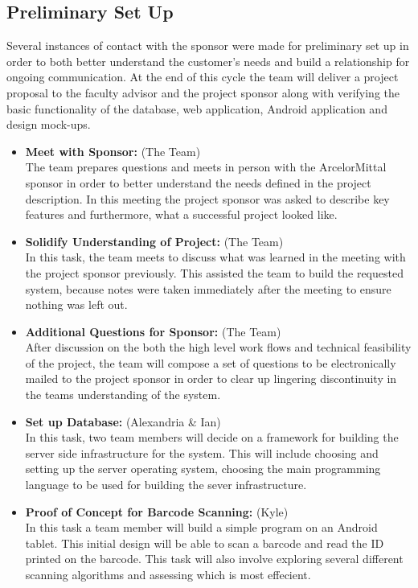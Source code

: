 \documentclass[Letter,11pt]{article}
\begin{document}
	\subsection{Preliminary Set Up}\label{cyc1}
		 Several instances of contact with the sponsor were made for preliminary set up in order to both better understand the customer's needs and build a relationship for ongoing communication. At the end of this cycle the team will deliver a project proposal to the faculty advisor and the project sponsor along with verifying the basic functionality of the database, web application, Android application and design mock-ups. 
		\begin{itemize}
			\item\textbf{Meet with Sponsor:} (The Team)\\
			The team prepares questions and meets in person with the ArcelorMittal sponsor in order to better understand the needs defined in the project description. In this meeting the project sponsor was asked to describe key features and furthermore, what a successful project looked like.
			\item \textbf{Solidify Understanding of Project:} (The Team)\\
			In this task, the team meets to discuss what was learned in the meeting with the project sponsor previously. This assisted the team to build the requested system, because notes were taken immediately after the meeting to ensure nothing was left out. 
			\item\textbf{Additional Questions for Sponsor:} (The Team)\\
			After discussion on the both the high level work flows and technical feasibility of the project, the team will compose a set of questions to be electronically mailed to the project sponsor in order to clear up lingering discontinuity in the teams understanding of the system.
			\item\textbf{Set up Database:} (Alexandria \& Ian)\\
			In this task, two team members will decide on a framework for building the server side infrastructure for the system. This will include choosing and setting up the server operating system, choosing the main programming language to be used for building the sever infrastructure.
			\item\textbf{Proof of Concept for Barcode Scanning:} (Kyle)\\
			In this task a team member will build a simple program on an Android tablet. This initial design will be able to scan a barcode and read the ID printed on the barcode. This task will also involve exploring several different scanning algorithms and assessing which is most effecient.

\end{itemize}
\end{document}
